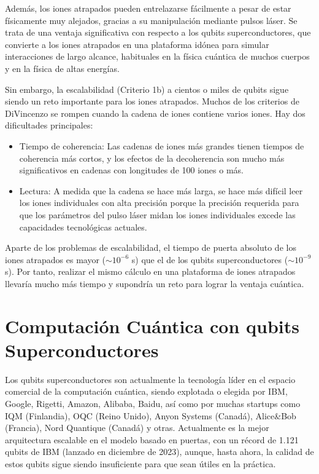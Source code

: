 Además, los iones atrapados pueden entrelazarse fácilmente a pesar de estar físicamente muy alejados, gracias a su manipulación mediante pulsos láser. Se trata de una ventaja significativa con respecto a los qubits superconductores, que convierte a los iones atrapados en una plataforma idónea para simular interacciones de largo alcance, habituales en la física cuántica de muchos cuerpos y en la física de altas energías.

Sin embargo, la escalabilidad (Criterio 1b) a cientos o miles de qubits sigue siendo un reto importante para los iones atrapados. Muchos de los criterios de DiVincenzo se rompen cuando la cadena de iones contiene varios iones. Hay dos dificultades principales:
\begin{itemize}
\item Tiempo de coherencia: Las cadenas de iones más grandes tienen tiempos de coherencia más cortos, y los efectos de la decoherencia son mucho más significativos en cadenas con longitudes de 100 iones o más.

\item Lectura: A medida que la cadena se hace más larga, se hace más difícil leer los iones individuales con alta precisión porque la precisión requerida para que los parámetros del pulso láser midan los iones individuales excede las capacidades tecnológicas actuales.
\end{itemize}

Aparte de los problemas de escalabilidad, el tiempo de puerta absoluto de los iones atrapados es mayor ($\sim 10^{-6}$ s) que el de los qubits superconductores ($\sim 10^{-9}$ s). Por tanto, realizar el mismo cálculo en una plataforma de iones atrapados llevaría mucho más tiempo y supondría un reto para lograr la ventaja cuántica.











\chapter{Computación Cuántica con qubits Superconductores} \label{sec_chapter_hw_scq}


Los qubits superconductores son actualmente la tecnología líder en el espacio comercial de la computación cuántica, siendo explotada o elegida por IBM, Google, Rigetti, Amazon, Alibaba, Baidu, así como por muchas startups como IQM (Finlandia), OQC (Reino Unido), Anyon Systems (Canadá), Alice{\&}Bob (Francia), Nord Quantique (Canadá) y otras. Actualmente es la mejor arquitectura escalable en el modelo basado en puertas, con un récord de 1.121  qubits de IBM (lanzado en diciembre de 2023), aunque, hasta ahora, la calidad de estos qubits sigue siendo insuficiente para que sean útiles en la práctica.


